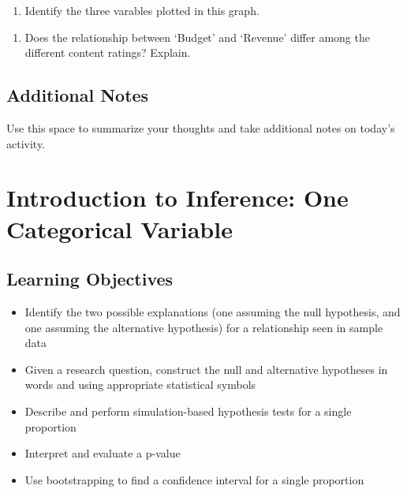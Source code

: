 \documentclass[
]{report}
\providecommand{\tightlist}{%
  \setlength{\itemsep}{0pt}\setlength{\parskip}{0pt}}
\begin{document}
\begin{enumerate}
\def\labelenumi{\arabic{enumi}.}
\setcounter{enumi}{24}
\tightlist
\item
  Identify the three varables plotted in this graph.
\end{enumerate}

\vspace{0.5in}

\begin{enumerate}
\def\labelenumi{\arabic{enumi}.}
\setcounter{enumi}{25}
\tightlist
\item
  Does the relationship between `Budget' and `Revenue' differ among the different content ratings? Explain.
\end{enumerate}

\vspace{1in}

\hypertarget{additional-notes}{%
\section{Additional Notes}\label{additional-notes}}

Use this space to summarize your thoughts and take additional notes on today's activity.

\hypertarget{introduction-to-inference-one-categorical-variable}{%
\chapter{Introduction to Inference: One Categorical Variable}\label{introduction-to-inference-one-categorical-variable}}

\hypertarget{learning-objectives}{%
\section{Learning Objectives}\label{learning-objectives}}

\begin{itemize}
\item
  Identify the two possible explanations (one assuming the null hypothesis, and one assuming the alternative hypothesis) for a relationship seen in sample data
\item
  Given a research question, construct the null and alternative hypotheses
  in words and using appropriate statistical symbols
\item
  Describe and perform simulation-based hypothesis tests for a single proportion
\item
  Interpret and evaluate a p-value
\item
  Use bootstrapping to find a confidence interval for a single proportion
\end{itemize}
\end{document}
